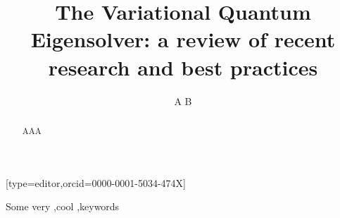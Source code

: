 \documentclass[a4paper,fleqn]{../cas-sc}
\renewcommand{\ProjectRoot}{..}
\begin{document}
\title[mode=title]{The Variational Quantum Eigensolver: a review of recent research and best practices}

\author[1]{A B}[type=editor,orcid=0000-0001-5034-474X]
\address[1]{Rahko  Limited,  N4 3JP London,  United  Kingdom}

\begin{abstract}
AAA
\end{abstract}

\begin{keywords}
Some very \sep cool \sep keywords
\end{keywords}

\maketitle
\tableofcontents 

% 
% 
% 


% 

\clearpage


\clearpage


\end{document}
